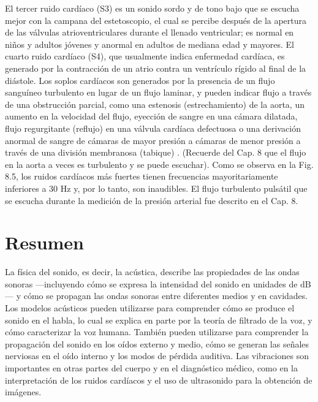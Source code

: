 \documentclass[12pt]{book}
\begin{document}
El tercer ruido cardíaco (S3) es un sonido sordo y de tono bajo que se escucha mejor con la campana del estetoscopio, el cual se percibe después de la apertura de las válvulas atrioventriculares durante el llenado ventricular; es normal en niños y adultos jóvenes y anormal en adultos de mediana edad y mayores. El cuarto ruido cardíaco (S4), que usualmente indica enfermedad cardíaca, es generado por la contracción de un atrio contra un ventrículo rígido al final de la diástole. Los soplos cardíacos son generados por la presencia de un flujo sanguíneo turbulento en lugar de un flujo laminar, y pueden indicar flujo a través de una obstrucción parcial, como una estenosis (estrechamiento) de la aorta, un aumento en la velocidad del flujo, eyección de sangre en una cámara dilatada, flujo regurgitante (reflujo) en una válvula cardíaca defectuosa o una derivación anormal de sangre de cámaras de mayor presión a cámaras de menor presión a través de una división membranosa (tabique) \cite{45}. (Recuerde del Cap. 8 que el flujo en la aorta a veces es turbulento y se puede escuchar). Como se observa en la Fig. 8.5, los ruidos cardíacos más fuertes tienen frecuencias mayoritariamente inferiores a $30\text{ Hz}$ y, por lo tanto, son inaudibles. El flujo turbulento pulsátil que se escucha durante la medición de la presión arterial fue descrito en el Cap. 8.

\section{Resumen}

La física del sonido, es decir, la acústica, describe las propiedades de las ondas sonoras ---incluyendo cómo se expresa la intensidad del sonido en unidades de $\text{dB}$--- y cómo se propagan las ondas sonoras entre diferentes medios y en cavidades. Los modelos acústicos pueden utilizarse para comprender cómo se produce el sonido en el habla, lo cual se explica en parte por la teoría de filtrado de la voz, y cómo caracterizar la voz humana. También pueden utilizarse para comprender la propagación del sonido en los oídos externo y medio, cómo se generan las señales nerviosas en el oído interno y los modos de pérdida auditiva. Las vibraciones son importantes en otras partes del cuerpo y en el diagnóstico médico, como en la interpretación de los ruidos cardíacos y el uso de ultrasonido para la obtención de imágenes.

\end{document}
